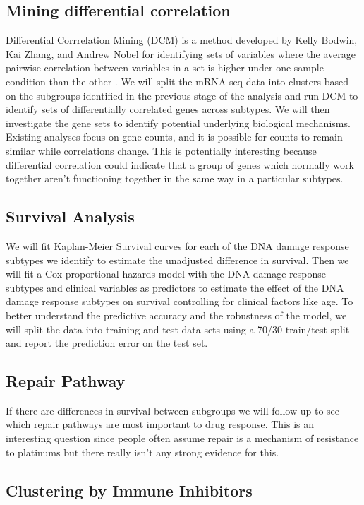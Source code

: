 \documentclass{article}
\begin{document}
\subsection{Mining differential correlation} 
Differential Corrrelation Mining (DCM) is a method developed by Kelly Bodwin, Kai Zhang, and Andrew Nobel for identifying sets of variables where the average pairwise correlation between variables in a set is higher under one sample condition than the other \cite{difcor2016} . We will split the mRNA-seq data into clusters based on the subgroups identified in the previous stage of the analysis and run DCM to identify sets of differentially correlated genes across subtypes. We will then investigate the gene sets to identify potential underlying biological mechanisms. Existing analyses focus on gene counts, and it is possible for counts to remain similar while correlations change. This is potentially interesting because differential correlation could indicate that a group of genes which normally work together aren't functioning together in the same way in a particular subtypes. 


\subsection{Survival Analysis}
We will fit Kaplan-Meier Survival curves for each of the DNA damage response subtypes we identify to estimate the unadjusted difference in survival. Then we will fit a Cox proportional hazards model with the DNA damage response subtypes and clinical variables as predictors to estimate the effect of the DNA damage response subtypes on survival controlling for clinical factors like age. To better understand the predictive accuracy and the robustness of the model, we will split the data into training and test data sets using a 70/30 train/test split and report the prediction error on the test set. 

\subsection{Repair Pathway}

If there are differences in survival between subgroups we will follow up to see which repair pathways are most important to drug response. This is an interesting question since people often assume repair is a mechanism of resistance to platinums but there really isn't any strong evidence for this.

\subsection{Clustering by Immune Inhibitors}
\end{document}

